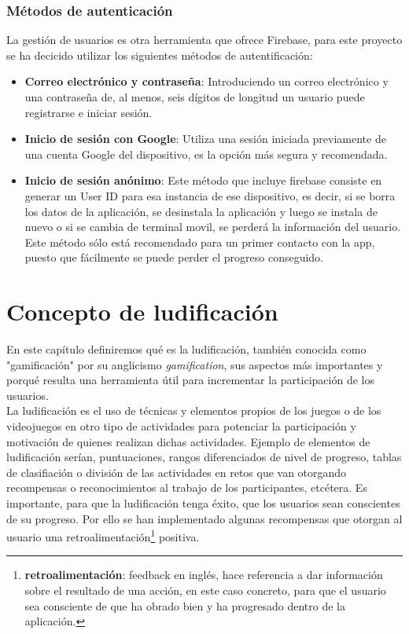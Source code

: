 \documentclass{report}
\begin{document}
\subsection{Métodos de autenticación}
La gestión de usuarios es otra herramienta que ofrece Firebase, para este proyecto se ha decicido utilizar los siguientes métodos de autentificación:
\begin{itemize}
\item \textbf{Correo electrónico y contraseña}: Introduciendo un correo electrónico y una contraseña de, al menos, seis dígitos de longitud un usuario puede registrarse e iniciar sesión.
\item \textbf{Inicio de sesión con Google}: Utiliza una sesión iniciada previamente de una cuenta Google del dispositivo, es la opción más segura y recomendada.
\item \textbf{Inicio de sesión anónimo}: Este método que incluye firebase consiste en generar un User ID para esa instancia de ese dispositivo, es decir, si se borra los datos de la aplicación, se desinstala la aplicación y luego se instala de nuevo o si se cambia de terminal movil, se perderá la información del usuario. Este método sólo está recomendado para un primer contacto con la app, puesto que fácilmente se puede perder el progreso conseguido.
\end{itemize}
\chapter{Concepto de ludificación}

En este capítulo definiremos qué es la ludificación, también conocida como "gamificación" por su anglicismo \textit{gamification}, sus aspectos más importantes y porqué resulta una herramienta útil para incrementar la participación de los usuarios.\\

La ludificación es el uso de técnicas y elementos propios de los juegos o de los videojuegos en otro tipo de actividades para potenciar la participación y motivación de quienes realizan dichas actividades. Ejemplo de elementos de ludificación serían, puntuaciones, rangos diferenciados de nivel de progreso, tablas de clasifiación o división de las actividades en retos que van otorgando recompensas o reconocimientos al trabajo de los participantes, etcétera. Es importante, para que la ludificación tenga éxito, que los usuarios sean conscientes de su progreso. Por ello se han implementado algunas recompensas que otorgan al usuario una retroalimentación\footnote{\textbf{retroalimentación}: feedback en inglés, hace referencia a dar información sobre el resultado de una acción, en este caso concreto, para que el usuario sea consciente de que ha obrado bien y ha progresado dentro de la aplicación.} positiva.\\
\end{document}
